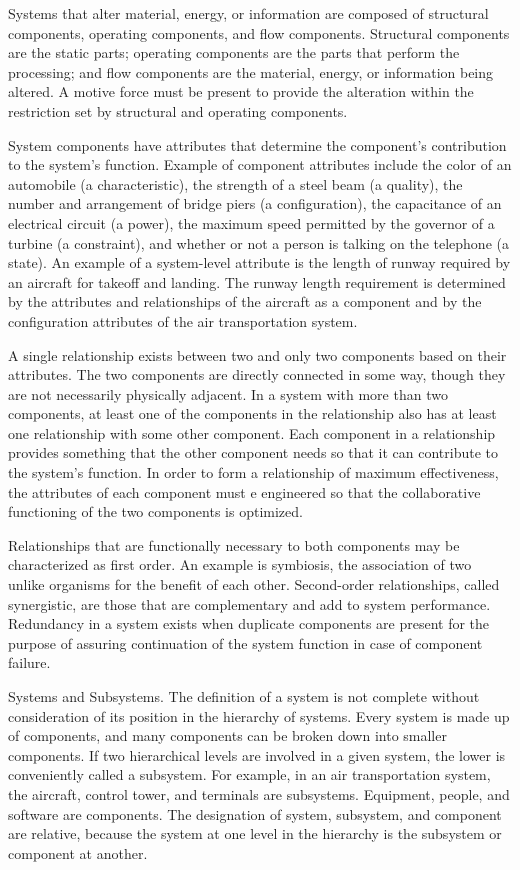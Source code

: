 Systems that alter material, energy, or information are composed of structural components, operating components, and flow components. Structural components are the static parts; operating components are the parts that perform the processing; and flow components are the material, energy, or information being altered. A motive force must be present to provide the alteration within the restriction set by structural and operating components.

System components have attributes that determine the component’s contribution to the system’s function. Example of component attributes include the color of an automobile (a characteristic), the strength of a steel beam (a quality), the number and arrangement of bridge piers (a configuration), the capacitance of an electrical circuit (a power), the maximum speed permitted by the governor of a turbine (a constraint), and whether or not a person is talking on the telephone (a state). An example of a system-level attribute is the length of runway required by an aircraft for takeoff and landing. The runway length requirement is determined by the attributes and relationships of the aircraft as a component and by the configuration attributes of the air transportation system.

A single relationship exists between two and only two components based on their attributes. The two components are directly connected in some way, though they are not necessarily physically adjacent. In a system with more than two components, at least one of the components in the relationship also has at least one relationship with some other component. Each component in a relationship provides something that the other component needs so that it can contribute to the system’s function. In order to form a relationship of maximum effectiveness, the attributes of each component must e engineered so that the collaborative functioning of the two components is optimized.

Relationships that are functionally necessary to both components may be characterized as first order. An example is symbiosis, the association of two unlike organisms for the benefit of each other. Second-order relationships, called synergistic, are those that are complementary and add to system performance. Redundancy in a system exists when duplicate components are present for the purpose of assuring continuation of the system function in case of component failure.

Systems and Subsystems. The definition of a system is not complete without consideration of its position in the hierarchy of systems. Every system is made up of components, and many components can be broken down into smaller components. If two hierarchical levels are involved in a given system, the lower is conveniently called a subsystem. For example, in an air transportation system, the aircraft, control tower, and terminals are subsystems. Equipment, people, and software are components. The designation of system, subsystem, and component are relative, because the system at one level in the hierarchy is the subsystem or component at another.

